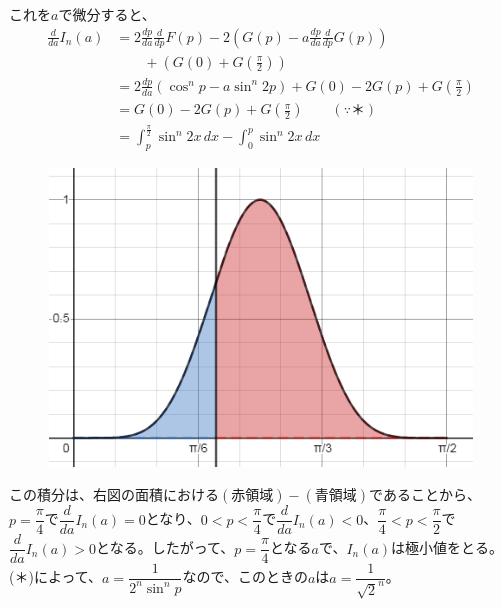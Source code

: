 これを$a$で微分すると、
\begin{align*}
 \frac{d}{da}I_n(a)&=2\frac{dp}{da}\frac{d}{dp}F(p)-2\left(G(p)-a\frac{dp}{da}\frac{d}{dp}G(p)\right) \\
 &\qquad +\left(G(0)+G\left(\frac{\pi}{2}\right)\right) \\
 &=2\frac{dp}{da}\left(\cos^n p-a\sin^n 2p\right) + G(0)-2G(p)+G\left(\frac{\pi}{2}\right) \\
 &=G(0)-2G(p)+G\left(\frac{\pi}{2}\right) \qquad (\because \text{＊}) \\
 &=\int_p^{\frac{\pi}{2}}\!\sin^n 2x \,dx -\int_0^p\! \sin^n 2x \,dx
\end{align*}
\begin{figure}
 \includegraphics[width=\linewidth]{../problems/Q_200/A_200_1.png}
\end{figure}
この積分は、右図の面積における$(\text{赤領域})-(\text{青領域})$であることから、$p=\dfrac{\pi}{4}$で$\dfrac{d}{da}I_n(a)=0$となり、$0<p<\dfrac{\pi}{4}$で$\dfrac{d}{da}I_n(a)<0$、$\dfrac{\pi}{4}<p<\dfrac{\pi}{2}$で$\dfrac{d}{da}I_n(a)>0$となる。したがって、$p=\dfrac{\pi}{4}$となる$a$で、$I_n(a)$は極小値をとる。(＊)によって、$a=\dfrac{1}{2^n\sin^n p}$なので、このときの$a$は$a=\dfrac{1}{\sqrt{2}^n}$。

